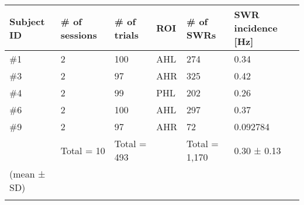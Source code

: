 \documentclass[a4paper]{article}
\begin{document}
\begin{tabular}{|l|l|l|l|l|l|}
\hline
Subject ID&\# of sessions&\# of trials&ROI&\# of SWRs&SWR incidence [Hz]\\
\hline
\#1&2&100&AHL&274&0.34\\
\hline
\#3&2&97&AHR&325&0.42\\
\hline
\#4&2&99&PHL&202&0.26\\
\hline
\#6&2&100&AHL&297&0.37\\
\hline
\#9&2&97&AHR&72&0.092784\\
\hline
&Total = 10&Total = 493&&Total = 1,170&0.30 ± 0.13\\
\hline
(mean ± SD)&&&&&\\
\hline
&&&&&\\
\hline
\end{tabular}
\end{document}
